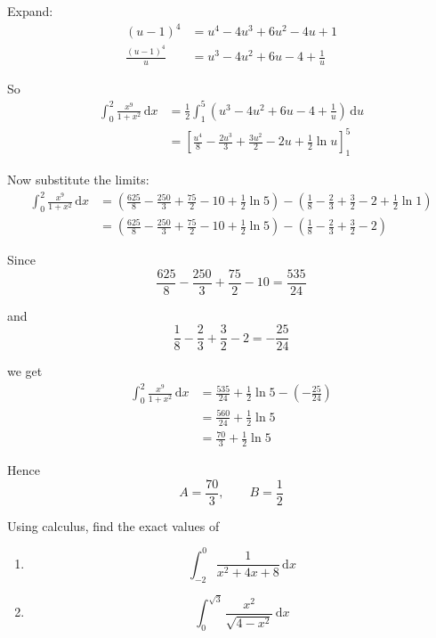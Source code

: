 \documentclass[leqno]{article}
\begin{document}
\begin{enumerate}[
  label=\textbf{\arabic*.},
  leftmargin=*,
  topsep=0pt,
  partopsep=0pt,
  parsep=0pt
]
\begin{djsSolution}
\begin{enumerate}[label=\textbf{(\alph*)}]
Expand:
\begin{align*}
(u-1)^4&=u^4-4u^3+6u^2-4u+1 \\
\frac{(u-1)^4}{u}&=u^3-4u^2+6u-4+\frac1u
\end{align*}

So
\begin{align*}
\int_0^2 \frac{x^9}{1+x^2}\,\mathrm{d}x
&=\frac12\int_1^5 \left(u^3-4u^2+6u-4+\frac1u\right)\,\mathrm{d}u \\
&=\left[\frac{u^4}{8}-\frac{2u^3}{3}+\frac{3u^2}{2}-2u+\frac12\ln u\right]_1^5
\end{align*}

Now substitute the limits:
\begin{align*}
\int_0^2 \frac{x^9}{1+x^2}\,\mathrm{d}x
&=\left(\frac{625}{8}-\frac{250}{3}+\frac{75}{2}-10+\frac12\ln 5\right)
-\left(\frac18-\frac23+\frac32-2+\frac12\ln 1\right) \\
&=\left(\frac{625}{8}-\frac{250}{3}+\frac{75}{2}-10+\frac12\ln 5\right)
-\left(\frac18-\frac23+\frac32-2\right)
\end{align*}

Since
\[
\frac{625}{8}-\frac{250}{3}+\frac{75}{2}-10=\frac{535}{24}
\]

and
\[
\frac18-\frac23+\frac32-2=-\frac{25}{24}
\]

we get
\begin{align*}
\int_0^2 \frac{x^9}{1+x^2}\,\mathrm{d}x
&=\frac{535}{24}+\frac12\ln 5-\left(-\frac{25}{24}\right) \\
&=\frac{560}{24}+\frac12\ln 5 \\
&=\frac{70}{3}+\frac12\ln 5
\end{align*}

Hence
\[
A=\frac{70}{3},\qquad B=\frac12
\]
\end{enumerate}
\end{djsSolution}


\newpage

\questionitem

Using calculus, find the exact values of \\

\begin{enumerate}[label=(\roman*)]
  \item
  \[
  \int_{-2}^0 \frac{1}{x^2 + 4x + 8}\,\mathrm{d}x
  \]
  \item
  \[
  \int_0^{\sqrt{3}} \frac{x^2}{\sqrt{4 - x^2}}\,\mathrm{d}x
  \]
\end{enumerate}


\end{enumerate}
\end{document}
